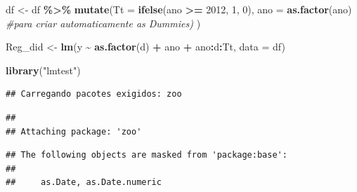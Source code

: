 \documentclass[
]{article}
\author{}
\date{\vspace{-2.5em}}
\newenvironment{Shaded}{\begin{snugshade}}{\end{snugshade}}
\newcommand{\AttributeTok}[1]{\textcolor[rgb]{0.13,0.29,0.53}{#1}}
\newcommand{\CommentTok}[1]{\textcolor[rgb]{0.56,0.35,0.01}{\textit{#1}}}
\newcommand{\DecValTok}[1]{\textcolor[rgb]{0.00,0.00,0.81}{#1}}
\newcommand{\FunctionTok}[1]{\textcolor[rgb]{0.13,0.29,0.53}{\textbf{#1}}}
\newcommand{\NormalTok}[1]{#1}
\newcommand{\OtherTok}[1]{\textcolor[rgb]{0.56,0.35,0.01}{#1}}
\newcommand{\SpecialCharTok}[1]{\textcolor[rgb]{0.81,0.36,0.00}{\textbf{#1}}}
\newcommand{\StringTok}[1]{\textcolor[rgb]{0.31,0.60,0.02}{#1}}
\begin{document}
\begin{Shaded}
\begin{Highlighting}[]
\NormalTok{df }\OtherTok{\textless{}{-}}\NormalTok{ df }\SpecialCharTok{\%\textgreater{}\%} \FunctionTok{mutate}\NormalTok{(}\AttributeTok{Tt =} \FunctionTok{ifelse}\NormalTok{(ano }\SpecialCharTok{\textgreater{}=} \DecValTok{2012}\NormalTok{, }\DecValTok{1}\NormalTok{, }\DecValTok{0}\NormalTok{),}
                    \AttributeTok{ano =} \FunctionTok{as.factor}\NormalTok{(ano) }\CommentTok{\#para criar automaticamente as Dummies)}
\NormalTok{                    )}
\end{Highlighting}
\end{Shaded}

\begin{Shaded}
\begin{Highlighting}[]
\NormalTok{Reg\_did }\OtherTok{\textless{}{-}} \FunctionTok{lm}\NormalTok{(y }\SpecialCharTok{\textasciitilde{}} \FunctionTok{as.factor}\NormalTok{(d) }\SpecialCharTok{+}\NormalTok{ ano }\SpecialCharTok{+}\NormalTok{ ano}\SpecialCharTok{:}\NormalTok{d}\SpecialCharTok{:}\NormalTok{Tt, }\AttributeTok{data =}\NormalTok{ df)}
\end{Highlighting}
\end{Shaded}

\begin{Shaded}
\begin{Highlighting}[]
\FunctionTok{library}\NormalTok{(}\StringTok{"lmtest"}\NormalTok{)}
\end{Highlighting}
\end{Shaded}

\begin{verbatim}
## Carregando pacotes exigidos: zoo
\end{verbatim}

\begin{verbatim}
## 
## Attaching package: 'zoo'
\end{verbatim}

\begin{verbatim}
## The following objects are masked from 'package:base':
## 
##     as.Date, as.Date.numeric
\end{verbatim}
\end{document}
